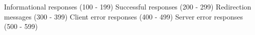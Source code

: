 Informational responses (100 - 199)
Successful responses (200 - 299)
Redirection messages (300 - 399)
Client error responses (400 - 499)
Server error responses (500 - 599)